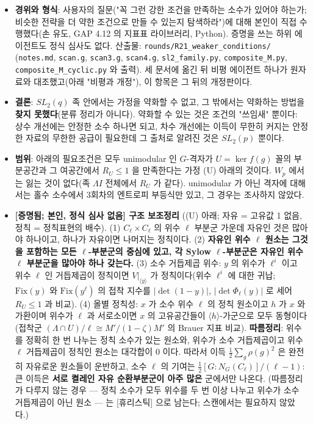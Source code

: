 \begin{itemize}
\tightlist
\item
  \textbf{경위와 형식}: 사용자의 질문("꼭 그런 강한 조건을 만족하는 소수가 있어야 하는가; 비슷한 전략을 더 약한 조건으로 만들 수 있는지 탐색하라")에 대해 본인이 직접 수행했다(손 유도, GAP 4.12 의 지표표 라이브러리, Python). 증명을 쓰는 하위 에이전트도 정식 심사도 없다. 산출물: \texttt{rounds/R21\_weaker\_conditions/} (\texttt{notes.md}, \texttt{scan.g}, \texttt{scan3.g}, \texttt{scan4.g}, \texttt{sl2\_family.py}, \texttt{composite\_M.py}, \texttt{composite\_M\_cyclic.py} 와 출력). 세 문서에 옮긴 뒤 비평 에이전트 하나가 원자료와 대조했고(아래 "비평과 개정"), 이 항목은 그 뒤의 개정판이다.
\item
  \textbf{결론}: \(SL_2(q)\) 족 안에서는 가정을 약화할 수 없고, 그 밖에서는 약화하는 방법을 \textbf{찾지 못했다}(분류 정리가 아니다). 약화할 수 있는 것은 조건의 "쓰임새" 뿐이다: 상수 개선에는 안정한 소수 하나면 되고, 차수 개선에는 이득이 무한히 커지는 안정한 자료의 무한한 공급이 필요한데 그 출처로 알려진 것은 \(SL_2(p)\) 뿐이다.
\item
  \textbf{범위}: 아래의 필요조건은 모두 unimodular 인 \(G\)-격자가 \(U=\ker f(g)\) 꼴의 부분공간과 그 여공간에서 \(R_U\le1\) 을 만족한다는 가정 (U) 아래의 것이다. \(W_p\) 에서는 잃는 것이 없다(족 \(\Lambda I\) 전체에서 \(R_U\) 가 같다). unimodular 가 아닌 격자에 대해서는 홀수 소수에서 3회차의 엔트로피 부등식만 있고, 그 경우는 조사하지 않았다.
\item
  \textbf{{[}증명됨; 본인, 정식 심사 없음{]} 구조 보조정리} ((U) 아래; 자유 = 고유값 1 없음, 정칙 = 정칙표현의 배수). (1) \(C_\ell\times C_\ell\) 의 위수 \(\ell\) 부분군 가운데 자유인 것은 많아야 하나이고, 하나가 자유이면 나머지는 정칙이다. (2) \textbf{자유인 위수 \(\ell\) 원소는 그것을 포함하는 모든 \(\ell\)-부분군의 중심에 있고, 각 Sylow \(\ell\)-부분군은 자유인 위수 \(\ell\) 부분군을 많아야 하나 갖는다.} (3) 소수 거듭제곱 위수: \(y\) 의 위수가 \(\ell^i\) 이고 위수 \(\ell\) 인 거듭제곱이 정칙이면 \(V|_{\langle y\rangle}\) 가 정칙이다(위수 \(\ell^i\) 에 대한 귀납; \(\mathrm{Fix}(y)\) 와 \(\mathrm{Fix}(y^\ell)\) 의 접착 지수를 \(|\det(1-y)|\), \(|\det\Phi_\ell(y)|\) 로 세어 \(R_U\le1\) 과 비교). (4) 올별 정칙성: \(x\) 가 소수 위수 \(\ell\) 의 정칙 원소이고 \(h\) 가 \(x\) 와 가환이며 위수가 \(\ell\) 과 서로소이면 \(x\) 의 고유공간들이 \(\langle h\rangle\)-가군으로 모두 동형이다(접착군 \((\Lambda\cap U)/\ell\cong M'/(1-\zeta)M'\) 의 Brauer 지표 비교). \textbf{따름정리}: 위수를 정확히 한 번 나누는 정칙 소수가 있는 원소와, 위수가 소수 거듭제곱이고 위수 \(\ell\) 거듭제곱이 정칙인 원소는 대각합이 0 이다. 따라서 이득 \(\tfrac12\sum_g\rho(g)^2\) 은 완전히 자유로운 원소들이 운반하고, 소수 \(\ell\) 의 기여는 \(\tfrac12[G:N_G(C_\ell)]/(\ell-1)\): 큰 이득은 \textbf{서로 켤레인 자유 순환부분군이 아주 많은} 군에서만 나온다. (따름정리가 다루지 않는 경우 --- 정칙 소수가 모두 위수를 두 번 이상 나누고 위수가 소수 거듭제곱이 아닌 원소 --- 는 {[}휴리스틱{]} 으로 남는다; 스캔에서는 필요하지 않았다.)

\end{itemize}
